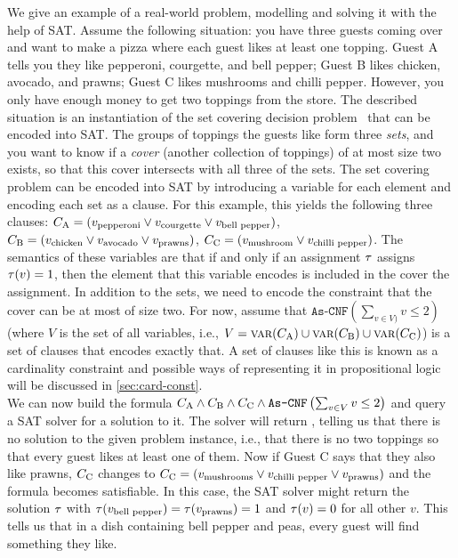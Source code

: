\begin{example}\label{ex:sat-modelling}
  We give an example of a real-world problem, modelling and solving it with the help of SAT.
  Assume the following situation:
  you have three guests coming over and want to make a pizza where each guest likes at least one topping.
  Guest A tells you they like pepperoni, courgette, and bell pepper;
  Guest B likes chicken, avocado, and prawns;
  Guest C likes mushrooms and chilli pepper.
  However, you only have enough money to get two toppings from the store.
  The described situation is an instantiation of the set covering decision problem~\autocite{DBLP:conf/coco/Karp72} that can be encoded into SAT.
  The groups of toppings the guests like form three \emph{sets}, and you want to know if a \emph{cover} (another collection of toppings) of at most size two exists, so that this cover intersects with all three of the sets.
  The set covering problem can be encoded into SAT by introducing a variable for each element and encoding each set as a clause.
  For this example, this yields the following three clauses: $C_\text{A} = (v_\text{pepperoni} \lor v_\text{courgette} \lor v_\text{bell pepper})$, $C_\text{B} = (v_\text{chicken} \lor v_\text{avocado} \lor v_\text{prawns})$, $C_\text{C} = (v_\text{mushroom} \lor v_\text{chilli pepper})$.
  The semantics of these variables are that if and only if an assignment $\tau$ assigns $\tau(v)=1$, then the element that this variable encodes is included in the cover the assignment.
  In addition to the sets, we need to encode the constraint that the cover can be at most of size two.
  For now, assume that $\texttt{As-CNF}\left(\sum_{v \in V)} v \le 2\right)$ (where $V$ is the set of all variables, i.e., $V = \textsc{var}(C_\text{A}) \cup \textsc{var}(C_\text{B}) \cup \textsc{var}(C_\text{C})$) is a set of clauses that encodes exactly that.
  A set of clauses like this is known as a cardinality constraint and possible ways of representing it in propositional logic will be discussed in \cref{sec:card-const}.\\
  We can now build the formula $C_\text{A} \allowbreak \land C_\text{B} \allowbreak \land C_\text{C} \allowbreak \land \texttt{As-CNF}\left(\sum_{v \in V} v \le 2\right)$ and query a SAT solver for a solution to it.
  The solver will return \unsat{}, telling us that there is no solution to the given problem instance, i.e., that there is no two toppings so that every guest likes at least one of them.
  Now if Guest C says that they also like prawns, $C_\text{C}$ changes to $C_\text{C} = (v_\text{mushrooms} \lor v_\text{chilli pepper} \lor v_\text{prawns})$ and the formula becomes satisfiable.
  In this case, the SAT solver might return the solution $\tau$ with $\tau(v_\text{bell pepper}) = \tau(v_\text{prawns}) = 1$ and $\tau(v) = 0$ for all other $v$.
  This tells us that in a dish containing bell pepper and peas, every guest will find something they like.
\end{example}

